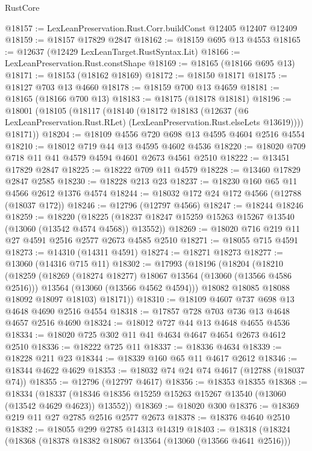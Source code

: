 \begin{lexlean}{RustCore}
\begin{coremodule}
@18157 := LexLeanPreservation.Rust.Corr.buildConst @12405 @12407 @12409
@18159 := @18157 @17829 @2847
@18162 := @18159 @695 @13 @4553
@18165 := @12637 (@12429 LexLeanTarget.RustSyntax.Lit)
@18166 := LexLeanPreservation.Rust.constShape
@18169 := @18165 (@18166 @695 @13)
@18171 := @18153 (@18162 @18169)
@18172 := @18150 @18171
@18175 := @18127 @703 @13 @4660
@18178 := @18159 @700 @13 @4659
@18181 := @18165 (@18166 @700 @13)
@18183 := @18175 (@18178 @18181)
@18196 := @18001
    (@18105
      (@18117
        (@18140
          (@18172
            @18183
            (@12637 (@6 LexLeanPreservation.Rust.RLet) (LexLeanPreservation.Rust.elseLets @13619))))
        @18171))
@18204 := @18109 @4556 @720 @698 @13 @4595 @4604 @2516 @4554
@18210 := @18012 @719 @44 @13 @4595 @4602 @4536
@18220 := @18020 @709 @718 @11 @41 @4579 @4594 @4601 @2673 @4561 @2510
@18222 := @13451 @17829 @2847
@18225 := @18222 @709 @11 @4579
@18228 := @13460 @17829 @2847 @2585
@18230 := @18228 @213 @23
@18237 := @18230 @160 @65 @11 @4566 @2612 @1376 @4574
@18244 := @18032 @172 @24 @172 @4566 (@12788 (@18037 @172))
@18246 := @12796 (@12797 @4566)
@18247 := @18244 @18246
@18259 := @18220
    (@18225 (@18237 @18247 @15259 @15263 @15267 @13540 (@13060 (@13542 @4574 @4568)) @13552))
@18269 := @18020 @716 @219 @11 @27 @4591 @2516 @2577 @2673 @4585 @2510
@18271 := @18055 @715 @4591
@18273 := @14310 (@14311 @4591)
@18274 := @18271 @18273
@18277 := @13060 (@14316 @715 @11)
@18302 := @17993
    (@18196
      (@18204
        (@18210
          (@18259
            (@18269 (@18274 @18277) @18067 @13564 (@13060 (@13566 @4586 @2516)))
            @13564
            (@13060 (@13566 @4562 @4594)))
          @18082
          @18085
          @18088
          @18092
          @18097
          @18103)
        @18171))
@18310 := @18109 @4607 @737 @698 @13 @4648 @4690 @2516 @4554
@18318 := @17857 @728 @703 @736 @13 @4648 @4657 @2516 @4690
@18324 := @18012 @727 @44 @13 @4648 @4655 @4536
@18334 := @18020 @725 @302 @11 @41 @4634 @4647 @4654 @2673 @4612 @2510
@18336 := @18222 @725 @11
@18337 := @18336 @4634
@18339 := @18228 @211 @23
@18344 := @18339 @160 @65 @11 @4617 @2612
@18346 := @18344 @4622 @4629
@18353 := @18032 @74 @24 @74 @4617 (@12788 (@18037 @74))
@18355 := @12796 (@12797 @4617)
@18356 := @18353 @18355
@18368 := @18334
    (@18337 (@18346 @18356 @15259 @15263 @15267 @13540 (@13060 (@13542 @4629 @4623)) @13552))
@18369 := @18020 @300
@18376 := @18369 @219 @11 @27 @2785 @2516 @2577 @2673
@18378 := @18376 @4640 @2510
@18382 := @18055 @299 @2785 @14313 @14319
@18403 := @18318
    (@18324
      (@18368
        (@18378 @18382 @18067 @13564 (@13060 (@13566 @4641 @2516)))

\end{coremodule}
\end{lexlean}
